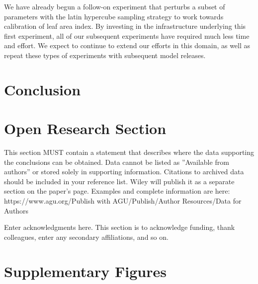 \documentclass[draft]{agujournal2019}
\begin{document}
We have already begun a follow-on experiment that perturbs a subset of parameters with the latin hypercube sampling strategy to work towards calibration of leaf area index. By investing in the infrastructure underlying this first experiment, all of our subsequent experiments have required much less time and effort. We expect to continue to extend our efforts in this domain, as well as repeat these types of experiments with subsequent model releases.

\section{Conclusion}
\section*{Open Research Section}
This section MUST contain a statement that describes where the data supporting the conclusions can be obtained. Data cannot be listed as ''Available from authors'' or stored solely in supporting information. Citations to archived data should be included in your reference list. Wiley will publish it as a separate section on the paper’s page. Examples and complete information are here:
https://www.agu.org/Publish with AGU/Publish/Author Resources/Data for Authors


\acknowledgments
Enter acknowledgments here. This section is to acknowledge funding, thank colleagues, enter any secondary affiliations, and so on.






\appendix
\section{Supplementary Figures}
\end{document}

